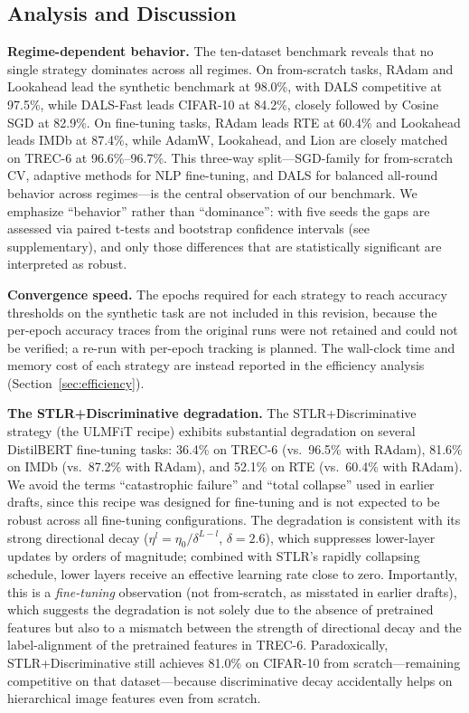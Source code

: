 \documentclass[a4paper,fleqn]{cas-dc}
\begin{document}
\subsection{Analysis and Discussion}\label{sec:analysis}

\textbf{Regime-dependent behavior.} The ten-dataset benchmark reveals that no single strategy dominates across all regimes. On from-scratch tasks, RAdam and Lookahead lead the synthetic benchmark at 98.0\%, with DALS competitive at 97.5\%, while DALS-Fast leads CIFAR-10 at 84.2\%, closely followed by Cosine SGD at 82.9\%. On fine-tuning tasks, RAdam leads RTE at 60.4\% and Lookahead leads IMDb at 87.4\%, while AdamW, Lookahead, and Lion are closely matched on TREC-6 at 96.6\%--96.7\%. This three-way split---SGD-family for from-scratch CV, adaptive methods for NLP fine-tuning, and DALS for balanced all-round behavior across regimes---is the central observation of our benchmark. We emphasize ``behavior'' rather than ``dominance'': with five seeds the gaps are assessed via paired t-tests and bootstrap confidence intervals (see supplementary), and only those differences that are statistically significant are interpreted as robust.

\textbf{Convergence speed.} The epochs required for each strategy to reach accuracy thresholds on the synthetic task are not included in this revision, because the per-epoch accuracy traces from the original runs were not retained and could not be verified; a re-run with per-epoch tracking is planned. The wall-clock time and memory cost of each strategy are instead reported in the efficiency analysis (Section~\ref{sec:efficiency}).

{\sloppy \textbf{The STLR+Discriminative degradation.} The STLR+Discriminative strategy (the ULMFiT recipe) exhibits substantial degradation on several DistilBERT fine-tuning tasks: 36.4\% on TREC-6 (vs.\ 96.5\% with RAdam), 81.6\% on IMDb (vs.\ 87.2\% with RAdam), and 52.1\% on RTE (vs.\ 60.4\% with RAdam). We avoid the terms ``catastrophic failure'' and ``total collapse'' used in earlier drafts, since this recipe was designed for fine-tuning and is not expected to be robust across all fine-tuning configurations. The degradation is consistent with its strong directional decay ($\eta^l = \eta_0 / \delta^{L-l}$, $\delta=2.6$), which suppresses lower-layer updates by orders of magnitude; combined with STLR's rapidly collapsing schedule, lower layers receive an effective learning rate close to zero. Importantly, this is a \emph{fine-tuning} observation (not from-scratch, as misstated in earlier drafts), which suggests the degradation is not solely due to the absence of pretrained features but also to a mismatch between the strength of directional decay and the label-alignment of the pretrained features in TREC-6. Paradoxically, STLR+Discriminative still achieves 81.0\% on CIFAR-10 from scratch---remaining competitive on that dataset---because discriminative decay accidentally helps on hierarchical image features even from scratch.\par}
\end{document}
